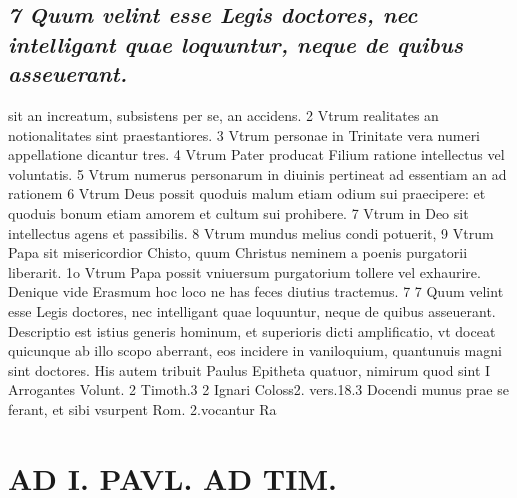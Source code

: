 \documentclass{article}
\begin{document}
\begin{pages}
\subsection*{\textit{7 Quum velint esse Legis doctores, nec intelligant quae loquuntur, neque de quibus asseuerant.}}sit an increatum, subsistens per se, an accidens. 2 Vtrum realitates an notionalitates sint praestantiores. 3 Vtrum personae in Trinitate vera numeri appellatione dicantur tres. 4 Vtrum Pater producat Filium ratione intellectus vel voluntatis. 5 Vtrum numerus personarum in diuinis pertineat ad essentiam an ad rationem 6 Vtrum Deus possit quoduis malum etiam odium sui praecipere: et quoduis bonum etiam amorem et cultum sui prohibere. 7 Vtrum in Deo sit intellectus agens et passibilis. 8 Vtrum mundus melius condi potuerit, 9 Vtrum Papa sit misericordior Chisto, quum Christus neminem a poenis purgatorii liberarit. 1o Vtrum Papa possit vniuersum purgatorium tollere vel exhaurire. Denique vide Erasmum hoc loco ne has feces diutius tractemus. 7 7 Quum velint esse Legis doctores, nec intelligant quae loquuntur, neque de quibus asseuerant. Descriptio est istius generis hominum, et superioris dicti amplificatio, vt doceat quicunque ab illo scopo aberrant, eos incidere in vaniloquium, quantunuis magni sint doctores. His autem tribuit Paulus Epitheta quatuor, nimirum quod sint I Arrogantes Volunt. 2 Timoth.3 2 Ignari Coloss2. vers.18.3 Docendi munus prae se ferant, et sibi vsurpent Rom. 2.vocantur Ra  \pend
\section*{AD I. PAVL. AD TIM. }
\marginpar{[ p.18 ]}\pstart {}
{}

\end{pages}
\end{document}
